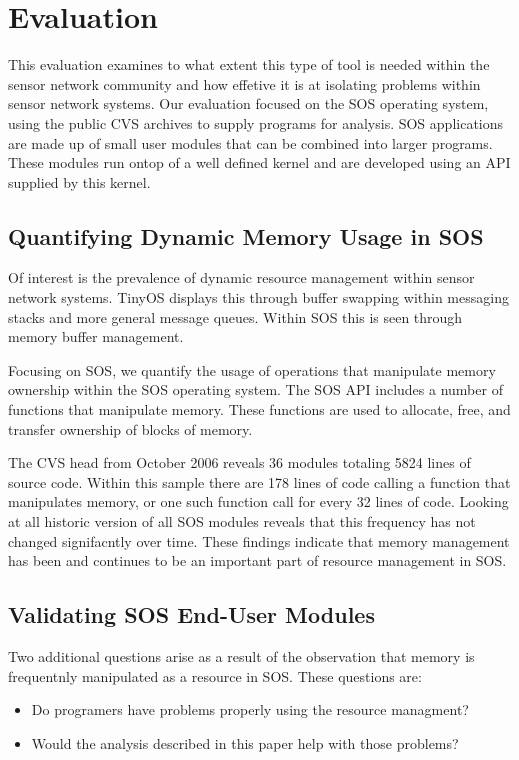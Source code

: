 \section{Evaluation}
\label{sec:eval}

This evaluation examines to what extent this type of tool is needed
within the sensor network community and how effetive it is at
isolating problems within sensor network systems.  Our evaluation
focused on the SOS operating system, using the public CVS archives to
supply programs for analysis.  SOS applications are made up of small
user modules that can be combined into larger programs.  These modules
run ontop of a well defined kernel and are developed using an API
supplied by this kernel.


\subsection{Quantifying Dynamic Memory Usage in SOS}

Of interest is the prevalence of dynamic resource management within
sensor network systems.  TinyOS displays this through buffer swapping
within messaging stacks and more general message queues.  Within SOS
this is seen through memory buffer management.  

Focusing on SOS, we quantify the usage of operations that manipulate
memory ownership within the SOS operating system.  The SOS API
includes a number of functions that manipulate memory.  These
functions are used to allocate, free, and transfer ownership of blocks
of memory.  

The CVS head from October 2006 reveals 36 modules totaling 5824 lines
of source code.  Within this sample there are 178 lines of code
calling a function that manipulates memory, or one such function call
for every 32 lines of code.  Looking at all historic version of all
SOS modules reveals that this frequency has not changed signifacntly
over time.  These findings indicate that memory management has been
and continues to be an important part of resource management in SOS.


\subsection{Validating SOS End-User Modules}

Two additional questions arise as a result of the observation that
memory is frequentnly manipulated as a resource in SOS.  These
questions are:
%
\begin{itemize}
%
\item Do programers have problems properly using the resource
managment?
%
\item Would the analysis described in this paper help with
those problems?
%
\end{itemize}

